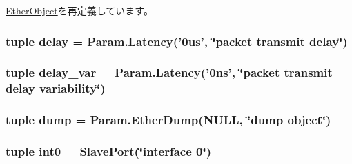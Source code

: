 \hyperlink{classEthernet_1_1EtherObject_a17da7064bc5c518791f0c891eff05fda}{EtherObject}を再定義しています。\hypertarget{classEthernet_1_1EtherLink_ac1ab55b34347f0110eb273c9d47d52e2}{
\subsubsection[{delay}]{\setlength{\rightskip}{0pt plus 5cm}tuple {\bf delay} = Param.Latency('0us', \char`\"{}packet transmit delay\char`\"{})}}
\label{classEthernet_1_1EtherLink_ac1ab55b34347f0110eb273c9d47d52e2}
\hypertarget{classEthernet_1_1EtherLink_a17e47f6cf0d24590c65fc34c0e1aa5e9}{
\subsubsection[{delay\_\-var}]{\setlength{\rightskip}{0pt plus 5cm}tuple {\bf delay\_\-var} = Param.Latency('0ns', \char`\"{}packet transmit delay variability\char`\"{})}}
\label{classEthernet_1_1EtherLink_a17e47f6cf0d24590c65fc34c0e1aa5e9}
\hypertarget{classEthernet_1_1EtherLink_aef8d0e67d5fcd75abc7d08ee1952b0de}{
\subsubsection[{dump}]{\setlength{\rightskip}{0pt plus 5cm}tuple {\bf dump} = Param.EtherDump(NULL, \char`\"{}dump object\char`\"{})}}
\label{classEthernet_1_1EtherLink_aef8d0e67d5fcd75abc7d08ee1952b0de}
\hypertarget{classEthernet_1_1EtherLink_a104730226138d5db620428dfce066f24}{
\subsubsection[{int0}]{\setlength{\rightskip}{0pt plus 5cm}tuple {\bf int0} = {\bf SlavePort}(\char`\"{}interface 0\char`\"{})}}
